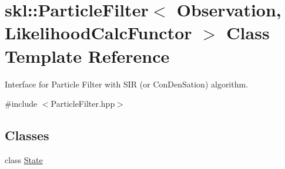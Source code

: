 \hypertarget{classskl_1_1_particle_filter}{}\section{skl\+:\+:Particle\+Filter$<$ Observation, Likelihood\+Calc\+Functor $>$ Class Template Reference}
\label{classskl_1_1_particle_filter}


Interface for Particle Filter with S\+IR (or Con\+Den\+Sation) algorithm.  




{\ttfamily \#include $<$Particle\+Filter.\+hpp$>$}

\subsection*{Classes}
\begin{DoxyCompactItemize}
\item 
class \hyperlink{classskl_1_1_particle_filter_1_1_state}{State}
\end{DoxyCompactItemize}
